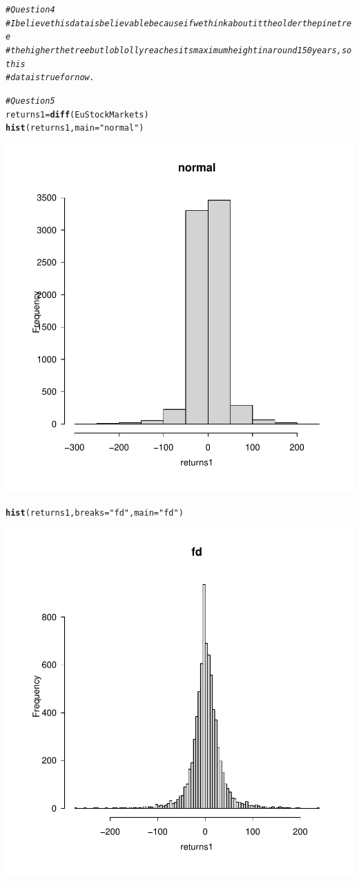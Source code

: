 \documentclass{article}\usepackage[]{graphicx}\usepackage[]{xcolor}
\makeatletter
\newcommand{\hlstr}[1]{\textcolor[rgb]{0.192,0.494,0.8}{#1}}%
\newcommand{\hlcom}[1]{\textcolor[rgb]{0.678,0.584,0.686}{\textit{#1}}}%
\newcommand{\hlstd}[1]{\textcolor[rgb]{0.345,0.345,0.345}{#1}}%
\newcommand{\hlkwb}[1]{\textcolor[rgb]{0.69,0.353,0.396}{#1}}%
\newcommand{\hlkwc}[1]{\textcolor[rgb]{0.333,0.667,0.333}{#1}}%
\newcommand{\hlkwd}[1]{\textcolor[rgb]{0.737,0.353,0.396}{\textbf{#1}}}%
\newenvironment{kframe}{%
 \def\at@end@of@kframe{}%
 \ifinner\ifhmode%
  \def\at@end@of@kframe{\end{minipage}}%
  \begin{minipage}{\columnwidth}%
 \fi\fi%
 \def\FrameCommand##1{\hskip\@totalleftmargin \hskip-\fboxsep
 \colorbox{shadecolor}{##1}\hskip-\fboxsep
     \hskip-\linewidth \hskip-\@totalleftmargin \hskip\columnwidth}%
 \MakeFramed {\advance\hsize-\width
   \@totalleftmargin\z@ \linewidth\hsize
   \@setminipage}}%
 {\par\unskip\endMakeFramed%
 \at@end@of@kframe}
\newenvironment{knitrout}{}{} %
\makeatother
\begin{document}
\begin{knitrout}
{}


\begin{kframe}\begin{alltt}
\hlcom{#Question 4}
\hlcom{# I believe this data is believable because if we think about it the older the pine tree}
\hlcom{# the higher the tree but loblolly reaches its maximum height in around 150 years, so this}
\hlcom{# data is true for now.}

\hlcom{#Question 5}
\hlstd{returns1} \hlkwb{=} \hlkwd{diff}\hlstd{(EuStockMarkets)}
\hlkwd{hist}\hlstd{(returns1,} \hlkwc{main} \hlstd{=} \hlstr{"normal"}\hlstd{)}
\end{alltt}
\end{kframe}

{\centering \includegraphics[width=.6\linewidth]{figure/Meng51940633A4-Rnwauto-report-5} 

}


\begin{kframe}\begin{alltt}
\hlkwd{hist}\hlstd{(returns1,} \hlkwc{breaks} \hlstd{=} \hlstr{"fd"}\hlstd{,} \hlkwc{main} \hlstd{=} \hlstr{"fd"}\hlstd{)}
\end{alltt}
\end{kframe}

{\centering \includegraphics[width=.6\linewidth]{figure/Meng51940633A4-Rnwauto-report-6} 

}
\end{knitrout}
\end{document}
